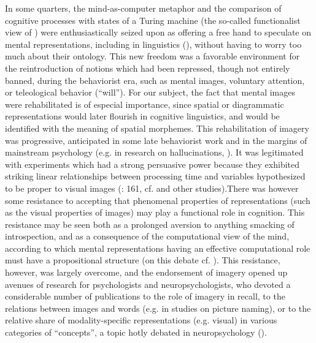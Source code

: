 \documentclass[output=paper]{langscibook}
\begin{document}
In some quarters, the mind-as-computer metaphor and the comparison of cognitive processes with states of a Turing machine (the so-called functionalist view of \citealt{putnam_minds_1960}) were enthusiastically seized upon as offering a free hand to speculate on mental representations, including in linguistics (\citealt{katz_mentalism_1964}), without having to worry too much about their ontology. This new freedom was a favorable environment for the reintroduction of notions which had been repressed, though not entirely banned, during the behaviorist era, such as mental images, voluntary attention, or teleological behavior (“will”). For our subject, the fact that mental images were rehabilitated is of especial importance, since spatial or diagrammatic representations would later flourish in cognitive linguistics, and would be identified with the meaning of spatial morphemes. This rehabilitation of imagery was progressive, anticipated in some late behaviorist work \citep[281ff]{mowrer_learning_1960} and in the margins of mainstream psychology (e.g. in research on hallucinations, \citealt{holt_imagery:_1964}). It was legitimated with experiments which had a strong persuasive power because they exhibited striking linear relationships between processing time and variables hypothesized to be proper to visual images (\citealt{baars_cognitive_1986}: 161, cf. \citealt{shepard_mental_1971} and other studies).There was however some resistance to accepting that phenomenal properties of representations (such as the visual properties of images) may play a functional role in cognition. This resistance may be seen both as a prolonged aversion to anything smacking of introspection, and as a consequence of the computational view of the mind, according to which mental representations having an effective computational role must have a propositional structure (on this debate cf. \citealt{fortis_image_1994}). This resistance, however, was largely overcome, and the endorsement of imagery opened up avenues of research for psychologists and neuropsychologists, who devoted a considerable number of publications to the role of imagery in recall, to the relations between images and words (e.g. in studies on picture naming), or to the relative share of modality-specific representations (e.g. visual) in various categories of “concepts”, a topic hotly debated in neuropsychology (\citealt{fortis_signification_1997}).
\end{document}
